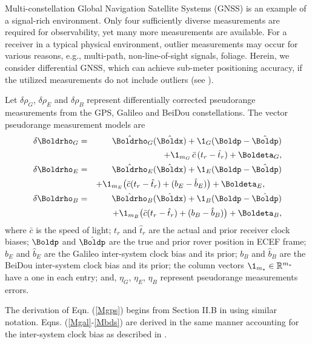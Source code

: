 \blue
Multi-constellation Global Navigation Satellite Systems (GNSS) is an example of a signal-rich environment.
Only four sufficiently diverse measurements are required for observability, yet many more measurements are available. 
For a receiver in a typical physical environment, outlier measurements may occur for various reasons, e.g., multi-path, non-line-of-sight signals, foliage. 
Herein, we consider differential GNSS, which can achieve sub-meter positioning accuracy, if the utilized measurements do not include outliers (see \cite{rahman2018ecef,rahmanphaseA, rahmanphaseB}). 

Let $\delta\rho_{G}$, $\delta\rho_{E}$ and $\delta\rho_{B}$ represent differentially corrected pseudorange measurements from the GPS, Galileo and BeiDou constellations.
The vector pseudorange measurement models are
\begin{eqnarray}
	\delta\Boldrho_{G} &=& \hat{\Boldrho}_G(\hat{\Boldx})+\1_G(\Boldp-\hat{\Boldp})  \nonumber \\ &&
	+ \1_{m_G} \,\bar{c} \, (t_r- \hat{t}_r) + \Boldeta_G,\label{Mgps}\\
	\delta\Boldrho_{E} &=& \hat{\Boldrho}_E(\hat{\Boldx})+\1_E(\Boldp-\hat{\Boldp})  \nonumber \\ &&
	+ \1_{m_E}\big( \bar{c} (t_r- \hat{t}_r) +(b_{E}-\hat{b}_{E})\big)+ \Boldeta_E,\label{Mgal}~~~~~~\\
	\delta\Boldrho_{B} &=& \hat{\Boldrho}_B(\hat{\Boldx})+\1_B(\Boldp-\hat{\Boldp})  \nonumber \\ &&
	+ \1_{m_B}\big( \bar{c} (t_r- \hat{t}_r) +(b_{B}-\hat{b}_{B})\big)+ \Boldeta_B,\label{Mbds}
\end{eqnarray}
where $\bar{c}$ is the speed of light; $t_r$ and $\hat{t}_r$ are the actual and prior receiver clock biases;
$\Boldp$ and $\hat{\Boldp}$ are the true and prior  rover position in ECEF frame;
$b_{E}$ and $\hat{b}_{E}$ are the Galileo inter-system clock bias and its prior;
$b_{B}$ and $\hat{b}_{B}$  are the BeiDou inter-system clock bias and its prior;
the column vectors $\1_{m_*}\in\mathbb{R}^{m_*}$ have a one in each entry;
and, $\eta_G$, $\eta_E$, $\eta_B$ represent pseudorange measurements errors.

The derivation of Eqn. (\ref{Mgps}) begins from Section II.B in \cite{aghapour2018outlier} using similar notation. 
Eqns. (\ref{Mgal}-\ref{Mbds}) are derived in the same manner accounting for the inter-system clock bias as described in \cite{dalla2015analysis}.

